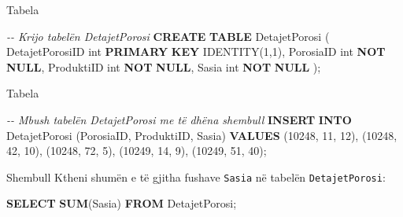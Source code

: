 \documentclass[
  ignorenonframetext,
]{beamer}
\newenvironment{Shaded}{\begin{snugshade}}{\end{snugshade}}
\newcommand{\CommentTok}[1]{\textcolor[rgb]{0.56,0.35,0.01}{\textit{#1}}}
\newcommand{\DataTypeTok}[1]{\textcolor[rgb]{0.13,0.29,0.53}{#1}}
\newcommand{\DecValTok}[1]{\textcolor[rgb]{0.00,0.00,0.81}{#1}}
\newcommand{\FunctionTok}[1]{\textcolor[rgb]{0.13,0.29,0.53}{\textbf{#1}}}
\newcommand{\KeywordTok}[1]{\textcolor[rgb]{0.13,0.29,0.53}{\textbf{#1}}}
\newcommand{\NormalTok}[1]{#1}
\begin{document}
\begin{frame}[fragile]{Tabela}
\label{tabela-4}

\begin{Shaded}
\begin{Highlighting}[]
\CommentTok{{-}{-} Krijo tabelën DetajetPorosi}
\KeywordTok{CREATE} \KeywordTok{TABLE}\NormalTok{ DetajetPorosi (}
\NormalTok{  DetajetPorosiID }\DataTypeTok{int} \KeywordTok{PRIMARY} \KeywordTok{KEY}\NormalTok{ IDENTITY(}\DecValTok{1}\NormalTok{,}\DecValTok{1}\NormalTok{),}
\NormalTok{  PorosiaID }\DataTypeTok{int} \KeywordTok{NOT} \KeywordTok{NULL}\NormalTok{,}
\NormalTok{  ProduktiID }\DataTypeTok{int} \KeywordTok{NOT} \KeywordTok{NULL}\NormalTok{,}
\NormalTok{  Sasia }\DataTypeTok{int} \KeywordTok{NOT} \KeywordTok{NULL}
\NormalTok{);}
\end{Highlighting}
\end{Shaded}
\end{frame}

\begin{frame}[fragile]{Tabela}
\label{tabela-5}

\begin{Shaded}
\begin{Highlighting}[]
\CommentTok{{-}{-} Mbush tabelën DetajetPorosi me të dhëna shembull}
\KeywordTok{INSERT} \KeywordTok{INTO}\NormalTok{ DetajetPorosi (PorosiaID, ProduktiID, Sasia)}
\KeywordTok{VALUES} 
\NormalTok{(}\DecValTok{10248}\NormalTok{, }\DecValTok{11}\NormalTok{, }\DecValTok{12}\NormalTok{),}
\NormalTok{(}\DecValTok{10248}\NormalTok{, }\DecValTok{42}\NormalTok{, }\DecValTok{10}\NormalTok{),}
\NormalTok{(}\DecValTok{10248}\NormalTok{, }\DecValTok{72}\NormalTok{, }\DecValTok{5}\NormalTok{),}
\NormalTok{(}\DecValTok{10249}\NormalTok{, }\DecValTok{14}\NormalTok{, }\DecValTok{9}\NormalTok{),}
\NormalTok{(}\DecValTok{10249}\NormalTok{, }\DecValTok{51}\NormalTok{, }\DecValTok{40}\NormalTok{);}
\end{Highlighting}
\end{Shaded}
\end{frame}

\begin{frame}[fragile]{Shembull}
\label{shembull-35}
Ktheni shumën e të gjitha fushave \texttt{Sasia} në tabelën
\texttt{DetajetPorosi}:


\begin{Shaded}
\begin{Highlighting}[]
\KeywordTok{SELECT} \FunctionTok{SUM}\NormalTok{(Sasia)}
\KeywordTok{FROM}\NormalTok{ DetajetPorosi;}
\end{Highlighting}
\end{Shaded}
\end{frame}
\end{document}
